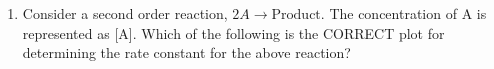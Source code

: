 \documentclass[journal,12pt,onecolumn]{IEEEtran}
\theoremstyle{remark}
\begin{document}
\begin{enumerate}
    \hfill{}
    \begin{enumerate}
    \end{enumerate}
    
    \item Consider a second order reaction, $2A \rightarrow \text{Product}$. The concentration of A is represented as [A]. Which of the following is the CORRECT plot for determining the rate constant for the above reaction?


\end{enumerate}
\end{document}
